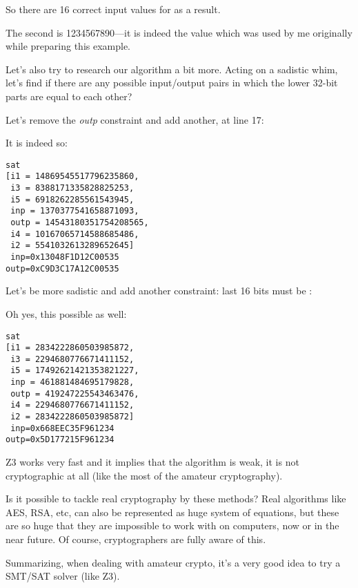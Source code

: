 So there are 16 correct input values for  as a result.

The second is 1234567890---it is indeed the value which was used by me originally while preparing this example.

Let's also try to research our algorithm a bit more.
Acting on a sadistic whim, let's find if there are any possible input/output pairs in 
which the lower 32-bit parts are equal to each other?

Let's remove the \textit{outp} constraint and add another, at line 17:



It is indeed so:

\begin{lstlisting}
sat
[i1 = 14869545517796235860,
 i3 = 8388171335828825253,
 i5 = 6918262285561543945,
 inp = 1370377541658871093,
 outp = 14543180351754208565,
 i4 = 10167065714588685486,
 i2 = 5541032613289652645]
 inp=0x13048F1D12C00535
outp=0xC9D3C17A12C00535
\end{lstlisting}

Let's be more sadistic and add another constraint: last 16 bits must be :



Oh yes, this possible as well:

\begin{lstlisting}
sat
[i1 = 2834222860503985872,
 i3 = 2294680776671411152,
 i5 = 17492621421353821227,
 inp = 461881484695179828,
 outp = 419247225543463476,
 i4 = 2294680776671411152,
 i2 = 2834222860503985872]
 inp=0x668EEC35F961234
outp=0x5D177215F961234
\end{lstlisting}

Z3 works very fast and it implies that the algorithm is weak, it is not cryptographic at all
(like the most of the amateur cryptography).

Is it possible to tackle real cryptography by these methods? 
Real algorithms like AES, RSA, etc, can also be represented as huge system of equations, 
but these are so huge that they are impossible to work with on computers, now or in the near future.
Of course, cryptographers are fully aware of this.

Summarizing, when dealing with amateur crypto, 
it's a very good idea to try a \ac{SMT}/\ac{SAT} solver (like Z3).

